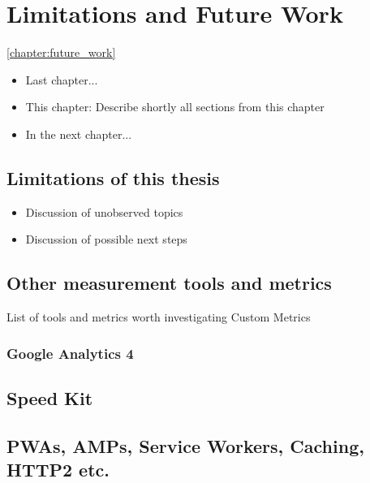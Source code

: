 \chapter{Limitations and Future Work}
\ref{chapter:future_work}

\begin{itemize}
	\item Last chapter...
	\item This chapter: Describe shortly all sections from this chapter
	\item In the next chapter...
\end{itemize}





\section{Limitations of this thesis}

\begin{itemize}
\item Discussion of unobserved topics
\item Discussion of possible next steps
\end{itemize}

\section{Other measurement tools and metrics}


List of tools and metrics worth investigating
Custom Metrics


\subsection{Google Analytics 4}


\section{Speed Kit}



\section{PWAs, AMPs, Service Workers, Caching, HTTP2 etc.}

